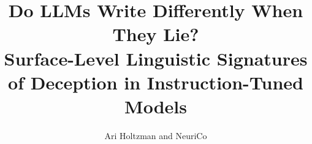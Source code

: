 \documentclass{article}
\title{Do LLMs Write Differently When They Lie?\\Surface-Level Linguistic Signatures of Deception in Instruction-Tuned Models}
\author{Ari Holtzman and NeuriCo}
\begin{document}
\maketitle

\begin{abstract}

\end{abstract}










\end{document}

